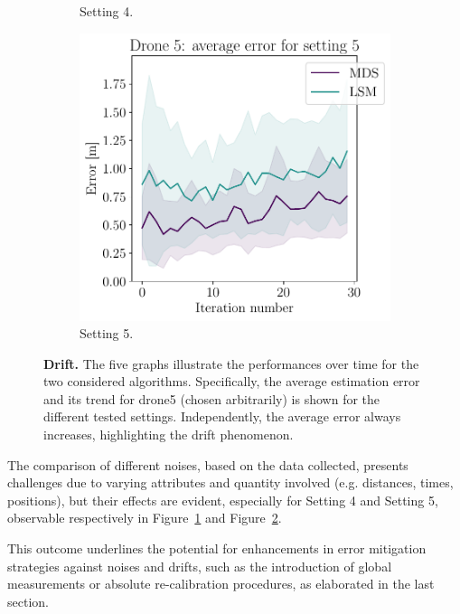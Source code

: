 \begin{figure}[!ht]
\begin{subfigure}[b]{0.28\textwidth}
         \caption{Setting 4.}
         \label{fig:setting4_drone5}
     \end{subfigure}
     \hfill
     \begin{subfigure}[b]{0.28\textwidth}
         \centering
         \includegraphics[width=\textwidth]{figures/drone5_setting5.pdf}
         \caption{Setting 5.}
         \label{fig:setting5_drone5}
     \end{subfigure}
     \hfill
     
     \caption[Drift]{
        \textbf{Drift.} 
        The five graphs illustrate the performances over time for the two considered algorithms. Specifically, the average estimation error and its trend for drone5 (chosen arbitrarily) is shown for the different tested settings. Independently, the average error always increases, highlighting the drift phenomenon. 
     }
     \label{fig:simulation_performances}
\end{figure}

The comparison of different noises, based on the data collected, presents challenges due to varying attributes and quantity involved (e.g. distances, times, positions), but their effects are evident, especially for Setting 4 and Setting 5, observable respectively in Figure~\ref{fig:setting4_drone5} and Figure~\ref{fig:setting5_drone5}. \par

This outcome underlines the potential for enhancements in error mitigation strategies against noises and drifts, such as the introduction of global measurements or absolute re-calibration procedures, as elaborated in the last section. \par

